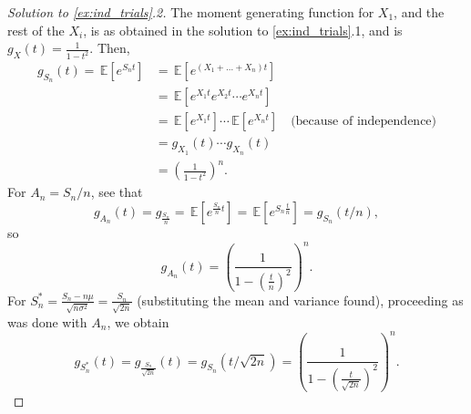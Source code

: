 \documentclass[letterpaper, 10 pt, conference]{article}
\newcommand\expec[1]{\, \mathbb{E} \left\lbrack #1 \right\rbrack}
\begin{document}
\begin{proof}[Solution to \ref{ex:ind_trials}.2]
	The moment generating function for $X_1$, and the rest of the $X_i$, is as obtained in the solution to \ref{ex:ind_trials}.1, and is $g_X (t) = \frac{1}{1 - t^2}$. Then, 
	\begin{align}
		g_{S_n} (t) = \expec{e^{S_n t}} &= \expec{e^{(X_1 + \dots + X_n) t}}\\
		&= \expec{e^{X_1 t} e^{X_2 t} \cdots e^{X_n t}} \\
		&= \expec{e^{X_1 t}} \cdots \expec{e^{X_n t}} \quad \text{(because of independence)} \\
		&= g_{X_1} (t) \cdots g_{X_n} (t) \\
		&= \left(\frac{1}{1-t^2}\right)^{n}.
	\end{align}
	For $A_n = S_n / n$, see that 
	\begin{equation}
		g_{A_n} (t) = g_{ \frac{S_n}{n} } = \expec{ e^{\frac{S_n}{n} t}} =  \expec{ e^{S_n \frac{t}{n}}} = g_{S_n} (t/n),
	\end{equation}
	so 
	\begin{equation}
		g_{A_n} (t) = \left( \frac{1}{1-(\frac{t}{n})^2} \right)^n.
	\end{equation}
	For $S_{n}^{\ast} = \frac{S_n - n\mu}{\sqrt{n \sigma^2}}  = \frac{S_n}{\sqrt{2 n}}$ (substituting the mean and variance found), proceeding as was done with $A_n$, we obtain 
	\begin{equation}
		g_{S_{n}^{\ast}} (t) = g_{\frac{S_n}{\sqrt{2n}}} (t)=  g_{S_n} (t / \sqrt{2n}) =  \left( \frac{1}{1-(\frac{t}{\sqrt{2n}})^2} \right)^n.
	\end{equation}
\end{proof}
\end{document}
